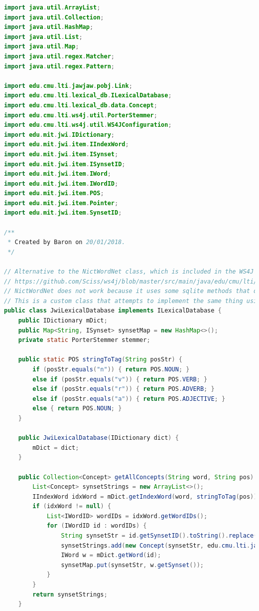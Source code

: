 \documentclass[11pt]{article}
\begin{document}
\begin{lstlisting}[language=Java]
import java.util.ArrayList;
import java.util.Collection;
import java.util.HashMap;
import java.util.List;
import java.util.Map;
import java.util.regex.Matcher;
import java.util.regex.Pattern;

import edu.cmu.lti.jawjaw.pobj.Link;
import edu.cmu.lti.lexical_db.ILexicalDatabase;
import edu.cmu.lti.lexical_db.data.Concept;
import edu.cmu.lti.ws4j.util.PorterStemmer;
import edu.cmu.lti.ws4j.util.WS4JConfiguration;
import edu.mit.jwi.IDictionary;
import edu.mit.jwi.item.IIndexWord;
import edu.mit.jwi.item.ISynset;
import edu.mit.jwi.item.ISynsetID;
import edu.mit.jwi.item.IWord;
import edu.mit.jwi.item.IWordID;
import edu.mit.jwi.item.POS;
import edu.mit.jwi.item.Pointer;
import edu.mit.jwi.item.SynsetID;

/**
 * Created by Baron on 20/01/2018.
 */

// Alternative to the NictWordNet class, which is included in the WS4J library.
// https://github.com/Sciss/ws4j/blob/master/src/main/java/edu/cmu/lti/lexical_db/NictWordNet.java
// NictWordNet does not work because it uses some sqlite methods that do not work in Android.
// This is a custom class that attempts to implement the same thing using MIT's JWI library.
public class JwiLexicalDatabase implements ILexicalDatabase {
    public IDictionary mDict;
    public Map<String, ISynset> synsetMap = new HashMap<>();
    private static PorterStemmer stemmer;

    public static POS stringToTag(String posStr) {
        if (posStr.equals("n")) { return POS.NOUN; }
        else if (posStr.equals("v")) { return POS.VERB; }
        else if (posStr.equals("r")) { return POS.ADVERB; }
        else if (posStr.equals("a")) { return POS.ADJECTIVE; }
        else { return POS.NOUN; }
    }

    public JwiLexicalDatabase(IDictionary dict) {
        mDict = dict;
    }

    public Collection<Concept> getAllConcepts(String word, String pos) {
        List<Concept> synsetStrings = new ArrayList<>();
        IIndexWord idxWord = mDict.getIndexWord(word, stringToTag(pos));
        if (idxWord != null) {
            List<IWordID> wordIDs = idxWord.getWordIDs();
            for (IWordID id : wordIDs) {
                String synsetStr = id.getSynsetID().toString().replace("SID-", "").toLowerCase();
                synsetStrings.add(new Concept(synsetStr, edu.cmu.lti.jawjaw.pobj.POS.valueOf(pos)));
                IWord w = mDict.getWord(id);
                synsetMap.put(synsetStr, w.getSynset());
            }
        }
        return synsetStrings;
    }


\end{lstlisting}
\end{document}
